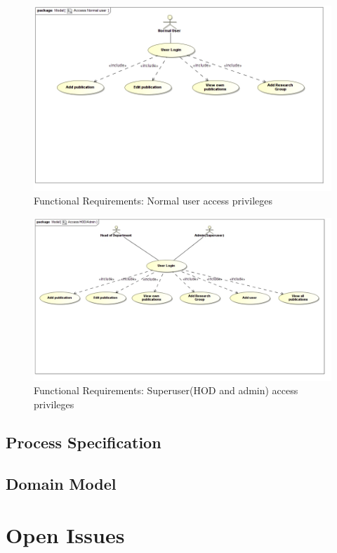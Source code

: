 \documentclass[a4paper]{article}
\begin{document}
	\begin{figure}[H]
		\includegraphics[width=\textwidth]{AccessNormaluser.jpg}
		\caption{Functional Requirements: Normal user access privileges \label{overflow}}
	\end{figure}
	\begin{figure}[H]
		\includegraphics[width=\textwidth]{AccessHODAdmin.jpg}
		\caption{Functional Requirements: Superuser(HOD and admin) access privileges \label{overflow}}
	\end{figure}
	\subsection{Process Specification}
	\subsection{Domain Model}
	
	
	\section{Open Issues}
	
	
\end{document}

